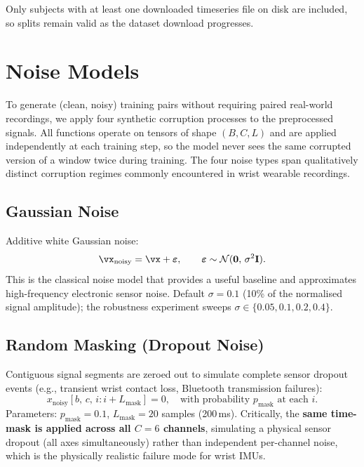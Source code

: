 \documentclass{article}
\begin{document}
Only subjects with at least one downloaded timeseries file on disk are included,
so splits remain valid as the dataset download progresses.

\section{Noise Models}
\label{sec:noise}

To generate (clean, noisy) training pairs without requiring paired real-world
recordings, we apply four synthetic corruption processes to the preprocessed
signals.
All functions operate on tensors of shape $(B, C, L)$ and are applied
independently at each training step, so the model never sees the same corrupted
version of a window twice during training.
The four noise types span qualitatively distinct corruption regimes commonly
encountered in wrist wearable recordings.

\subsection{Gaussian Noise}

Additive white Gaussian noise:
%
\begin{equation}
  \vx_{\text{noisy}} = \vx + \boldsymbol{\varepsilon},
  \qquad
  \boldsymbol{\varepsilon} \sim \mathcal{N}(\mathbf{0},\,\sigma^2 \mathbf{I}).
\end{equation}
%
This is the classical noise model that provides a useful baseline and
approximates high-frequency electronic sensor noise.
Default $\sigma = 0.1$ (10\% of the normalised signal amplitude);
the robustness experiment sweeps $\sigma \in \{0.05, 0.1, 0.2, 0.4\}$.

\subsection{Random Masking (Dropout Noise)}

Contiguous signal segments are zeroed out to simulate complete sensor dropout
events (e.g., transient wrist contact loss, Bluetooth transmission failures):
%
\begin{equation}
  x_{\text{noisy}}[b,\,c,\,i:i+L_{\text{mask}}] = 0,
  \quad \text{with probability } p_{\text{mask}} \text{ at each } i.
\end{equation}
%
Parameters: $p_{\text{mask}} = 0.1$, $L_{\text{mask}} = 20$ samples (200\,ms).
Critically, the \textbf{same time-mask is applied across all $C=6$ channels},
simulating a physical sensor dropout (all axes simultaneously) rather than
independent per-channel noise, which is the physically realistic failure mode
for wrist IMUs.
\end{document}
